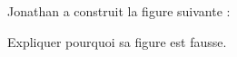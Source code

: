 
\begin{exercice}\label{exosmath-0997}

Jonathan a construit la figure suivante :
\begin{center}
   
\end{center}
Expliquer pourquoi sa figure est fausse.

\end{exercice}
